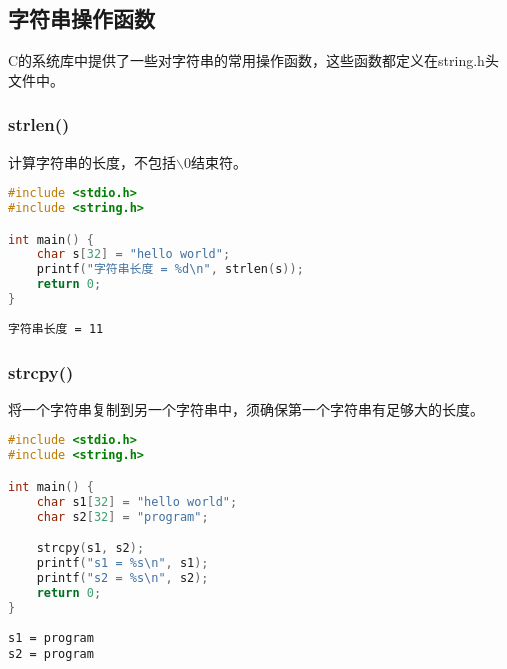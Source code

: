 \vspace{0.5cm}

\subsection{字符串操作函数}

C的系统库中提供了一些对字符串的常用操作函数，这些函数都定义在string.h头文件中。

\subsubsection{strlen()}

计算字符串的长度，不包括$ \backslash $0结束符。\\


\begin{lstlisting}[language=C]
#include <stdio.h>
#include <string.h>

int main() {
	char s[32] = "hello world";
	printf("字符串长度 = %d\n", strlen(s));
	return 0;
}
\end{lstlisting}

\begin{tcolorbox}
	\begin{verbatim}
字符串长度 = 11
	\end{verbatim}
\end{tcolorbox}

\subsubsection{strcpy()}

将一个字符串复制到另一个字符串中，须确保第一个字符串有足够大的长度。\\


\begin{lstlisting}[language=C]
#include <stdio.h>
#include <string.h>

int main() {
	char s1[32] = "hello world";
	char s2[32] = "program";

	strcpy(s1, s2);
	printf("s1 = %s\n", s1);
	printf("s2 = %s\n", s2);
	return 0;
}
\end{lstlisting}

\begin{tcolorbox}
	\begin{verbatim}
s1 = program
s2 = program
	\end{verbatim}
\end{tcolorbox}

